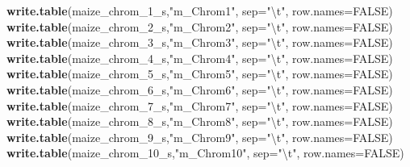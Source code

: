 \documentclass[]{article}
\newenvironment{Shaded}{\begin{snugshade}}{\end{snugshade}}
\newcommand{\CharTok}[1]{\textcolor[rgb]{0.31,0.60,0.02}{#1}}
\newcommand{\DataTypeTok}[1]{\textcolor[rgb]{0.13,0.29,0.53}{#1}}
\newcommand{\DecValTok}[1]{\textcolor[rgb]{0.00,0.00,0.81}{#1}}
\newcommand{\KeywordTok}[1]{\textcolor[rgb]{0.13,0.29,0.53}{\textbf{#1}}}
\newcommand{\NormalTok}[1]{#1}
\newcommand{\OtherTok}[1]{\textcolor[rgb]{0.56,0.35,0.01}{#1}}
\newcommand{\StringTok}[1]{\textcolor[rgb]{0.31,0.60,0.02}{#1}}
\begin{document}
\begin{Shaded}
\begin{Highlighting}[]
\KeywordTok{write.table}\NormalTok{(maize_chrom_}\DecValTok{1}\NormalTok{_s,}\StringTok{"m_Chrom1"}\NormalTok{, }\DataTypeTok{sep=}\StringTok{"}\CharTok{\textbackslash{}t}\StringTok{"}\NormalTok{, }\DataTypeTok{row.names=}\OtherTok{FALSE}\NormalTok{)}
\KeywordTok{write.table}\NormalTok{(maize_chrom_}\DecValTok{2}\NormalTok{_s,}\StringTok{"m_Chrom2"}\NormalTok{, }\DataTypeTok{sep=}\StringTok{"}\CharTok{\textbackslash{}t}\StringTok{"}\NormalTok{, }\DataTypeTok{row.names=}\OtherTok{FALSE}\NormalTok{)}
\KeywordTok{write.table}\NormalTok{(maize_chrom_}\DecValTok{3}\NormalTok{_s,}\StringTok{"m_Chrom3"}\NormalTok{, }\DataTypeTok{sep=}\StringTok{"}\CharTok{\textbackslash{}t}\StringTok{"}\NormalTok{, }\DataTypeTok{row.names=}\OtherTok{FALSE}\NormalTok{)}
\KeywordTok{write.table}\NormalTok{(maize_chrom_}\DecValTok{4}\NormalTok{_s,}\StringTok{"m_Chrom4"}\NormalTok{, }\DataTypeTok{sep=}\StringTok{"}\CharTok{\textbackslash{}t}\StringTok{"}\NormalTok{, }\DataTypeTok{row.names=}\OtherTok{FALSE}\NormalTok{)}
\KeywordTok{write.table}\NormalTok{(maize_chrom_}\DecValTok{5}\NormalTok{_s,}\StringTok{"m_Chrom5"}\NormalTok{, }\DataTypeTok{sep=}\StringTok{"}\CharTok{\textbackslash{}t}\StringTok{"}\NormalTok{, }\DataTypeTok{row.names=}\OtherTok{FALSE}\NormalTok{)}
\KeywordTok{write.table}\NormalTok{(maize_chrom_}\DecValTok{6}\NormalTok{_s,}\StringTok{"m_Chrom6"}\NormalTok{, }\DataTypeTok{sep=}\StringTok{"}\CharTok{\textbackslash{}t}\StringTok{"}\NormalTok{, }\DataTypeTok{row.names=}\OtherTok{FALSE}\NormalTok{)}
\KeywordTok{write.table}\NormalTok{(maize_chrom_}\DecValTok{7}\NormalTok{_s,}\StringTok{"m_Chrom7"}\NormalTok{, }\DataTypeTok{sep=}\StringTok{"}\CharTok{\textbackslash{}t}\StringTok{"}\NormalTok{, }\DataTypeTok{row.names=}\OtherTok{FALSE}\NormalTok{)}
\KeywordTok{write.table}\NormalTok{(maize_chrom_}\DecValTok{8}\NormalTok{_s,}\StringTok{"m_Chrom8"}\NormalTok{, }\DataTypeTok{sep=}\StringTok{"}\CharTok{\textbackslash{}t}\StringTok{"}\NormalTok{, }\DataTypeTok{row.names=}\OtherTok{FALSE}\NormalTok{)}
\KeywordTok{write.table}\NormalTok{(maize_chrom_}\DecValTok{9}\NormalTok{_s,}\StringTok{"m_Chrom9"}\NormalTok{, }\DataTypeTok{sep=}\StringTok{"}\CharTok{\textbackslash{}t}\StringTok{"}\NormalTok{, }\DataTypeTok{row.names=}\OtherTok{FALSE}\NormalTok{)}
\KeywordTok{write.table}\NormalTok{(maize_chrom_}\DecValTok{10}\NormalTok{_s,}\StringTok{"m_Chrom10"}\NormalTok{, }\DataTypeTok{sep=}\StringTok{"}\CharTok{\textbackslash{}t}\StringTok{"}\NormalTok{, }\DataTypeTok{row.names=}\OtherTok{FALSE}\NormalTok{)}
\end{Highlighting}
\end{Shaded}
\end{document}
